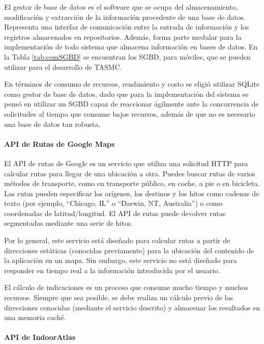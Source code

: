 \newpage
El gestor de base de datos es el software que se ocupa del almacenamiento, modificación y extracción de la información procedente de una base de datos. Representa una interfaz de comunicación entre la entrada de información y los registros almacenados en repositorios. Además, forma parte medular para la implementación de todo sistema que almacena información en bases de datos. En la Tabla \ref{tab:comSGBD} se encuentran los SGBD, para móviles, que se pueden utilizar para el desarrollo de TASMC.

En términos de consumo de recursos, rendimiento y costo se eligió utilizar SQLite como gestor de base de datos, dado que para la implementación del sistema se pensó en utilizar un SGBD capaz de reaccionar ágilmente ante la concurrencia de solicitudes al tiempo que consume bajos recursos, además de que no es necesario una base de datos tan robusta.

\paragraph{API de Rutas de Google Maps}

El API de rutas de Google es un servicio que utiliza una solicitud HTTP para calcular rutas para llegar de una ubicación a otra. Puedes buscar rutas de varios métodos de transporte, como en transporte público, en coche, a pie o en bicicleta. Las rutas pueden especificar los orígenes, los destinos y los hitos como cadenas de texto (por ejemplo, ``Chicago, IL'' o ``Darwin, NT, Australia'') o como coordenadas de latitud/longitud. El API de rutas puede devolver rutas segmentadas mediante una serie de hitos.

Por lo general, este servicio está diseñado para calcular rutas a partir de direcciones estáticas (conocidas previamente) para la ubicación del contenido de la aplicación en un mapa. Sin embargo, este servicio no está diseñado para responder en tiempo real a la información introducida por el usuario.

El cálculo de indicaciones es un proceso que consume mucho tiempo y muchos recursos. Siempre que sea posible, se debe realiza un cálculo previo de las direcciones conocidas (mediante el servicio descrito) y almacenar los resultados en una memoria caché. \cite{apiGoogleMaps}
\newpage
\paragraph{API de IndoorAtlas}
\hypertarget{APIIndoorAtlas}{}

